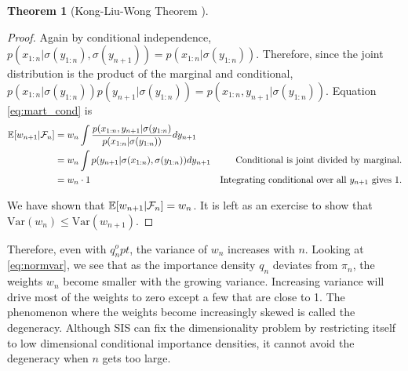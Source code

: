 \documentclass[10pt]{article}
\theoremstyle{definition}
\newtheorem{theorem}{Theorem}
\numberwithin{equation}{section}
\begin{document}
\begin{theorem}[Kong-Liu-Wong Theorem \cite{kong1994}]
\begin{proof}
	Again by conditional independence, $p(x_{1:n}|\sigma(y_{1:n}),\sigma(y_{n+1})) = p(x_{1:n}|\sigma(y_{1:n}))$. Therefore, since the joint distribution is the product of the marginal and conditional, $p(x_{1:n}|\sigma(y_{1:n})) p(y_{n+1}|\sigma(y_{1:n})) = p(x_{1:n},y_{n+1}|\sigma(y_{1:n})).$ Equation \eqref{eq:mart_cond} is
	\begin{align}
		\mathbb{E}[w_{n+1}| \mathcal{F}_n] &= w_n \int \dfrac{p(x_{1:n},y_{n+1}|\sigma(y_{1:n})}{p(x_{1:n}|\sigma(y_{1:n}))} dy_{n+1} \label{eq:mart_joint} \\
		&= w_n \int p(y_{n+1}|\sigma(x_{1:n}), \sigma(y_{1:n})) dy_{n+1} &\text{Conditional is joint divided by marginal.}\\
		&= w_n \cdot 1 &\text{Integrating conditional over all $y_{n+1}$ gives 1.}
	\end{align}
	
	We have shown that $\mathbb{E}[w_{n+1}|\mathcal{F}_n] = w_n$. It is left as an exercise to show that $\text{Var}(w_{n}) \leq \text{Var}(w_{n+1})$.
	\end{proof}
\end{theorem}

Therefore, even with $q_n^opt$, the variance of $w_n$ increases with $n$. Looking at \eqref{eq:normvar}, we see that as the importance density $q_n$ deviates from $\pi_n$, the weights $w_n$ become smaller with the growing variance. Increasing variance will drive most of the weights to zero except a few that are close to 1. The phenomenon where the weights become increasingly skewed is called the degeneracy. Although SIS can fix the dimensionality problem by restricting itself to low dimensional conditional importance densities, it cannot avoid the degeneracy when $n$ gets too large.
\end{document}
